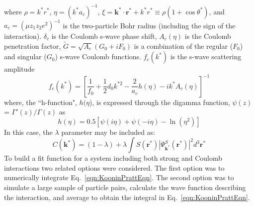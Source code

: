 \documentclass[ALICE,manyauthors]{cernphprep}
\begin{document}
where $\rho = k^{*}r^{*}$, $\eta = (k^{*}a_{c})^{-1}$, $\xi = \mathbf{k^{*}} \cdot \mathbf{r^{*}} + k^{*}r^{*} \equiv \rho(1+\cos\theta^{*})$, and $a_{c} = (\mu z_{1}z_{2}e^{2})^{-1}$ is the two-particle Bohr radius (including the sign of the interaction).  
$\delta_{c}$ is the Coulomb s-wave phase shift, $A_{c}(\eta)$ is the Coulomb penetration factor, $\tilde{G} = \sqrt{A_{c}}(G_{0} + iF_{0})$ is a combination of the regular ($F_{0}$) and singular ($G_{0}$) s-wave Coulomb functions.  
$f_{c}(k^{*})$ is the s-wave scattering amplitude
\begin{equation}
 f_{c}(k^{*}) = \left[\frac{1}{f_{0}} + \frac{1}{2}d_{0}k^{*2} - \frac{2}{a_{c}}h(\eta) - ik^{*}A_{c}(\eta)\right]^{-1}
\label{eqn:CoulombScattAmp}
\end{equation}
where, the ``h-function", $h(\eta$), is expressed through the digamma function, $\psi(z)$ = $\Gamma'(z)/\Gamma(z)$ as
\begin{equation}
 h(\eta) = 0.5[\psi(i\eta) + \psi(-i\eta) - \ln(\eta^{2})]
\label{eqn:LednickyHFunction}
\end{equation} 
In this case, the $\lambda$ parameter may be included as: 
\begin{equation}
 C(\mathbf{k^{*}}) = (1 - \lambda) + \lambda\int S(\mathbf{r^{*}})|\Psi^{S}_{\mathbf{k^{*}}}(\mathbf{r^{*}})|^{2}d^{3}\mathbf{r^{*}}
\label{eqn:GenCfEqnwLambda}
\end{equation}
To build a fit function for a system including both strong and Coulomb interactions two related options were considered. 
The first option was to numerically integrate Eq.\ \ref{eqn:KooninPrattEqn}.  
The second option was to simulate a large sample of particle pairs, calculate the wave function describing the interaction, and average to obtain the integral in Eq.\ \ref{eqn:KooninPrattEqn}. 
\end{document}
